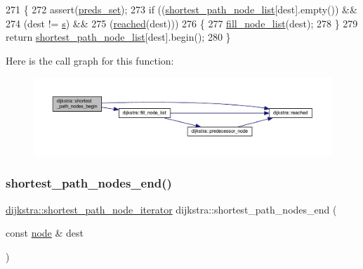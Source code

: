 \begin{DoxyCode}
271 \{
272     assert(\mbox{\hyperlink{classdijkstra_aaba530e703b5d4005b3c01fa1a11182d}{preds\_set}});
273     \textcolor{keywordflow}{if} ((\mbox{\hyperlink{classdijkstra_a67b45d0af528737830ea559ee42c4685}{shortest\_path\_node\_list}}[dest].empty()) &&
274     (dest != \mbox{\hyperlink{classdijkstra_a721bfb648626a1be2b9d276d85ebdb9d}{s}}) &&
275     (\mbox{\hyperlink{classdijkstra_a405ff80abfc9ad98668534032eed6a5b}{reached}}(dest)))
276     \{
277     \mbox{\hyperlink{classdijkstra_a71ad317c485ce76d3d22399f1a8c83fe}{fill\_node\_list}}(dest);
278     \}
279     \textcolor{keywordflow}{return} \mbox{\hyperlink{classdijkstra_a67b45d0af528737830ea559ee42c4685}{shortest\_path\_node\_list}}[dest].begin();
280 \}
\end{DoxyCode}
Here is the call graph for this function\+:\nopagebreak
\begin{figure}[H]
\begin{center}
\leavevmode
\includegraphics[width=350pt]{classdijkstra_ae30c66319d925387ed858aab9ce419ae_cgraph}
\end{center}
\end{figure}
\mbox{\label{classdijkstra_ae9846beeabd53a8cf0c0c1af328235b2}} 
\subsubsection{\texorpdfstring{shortest\+\_\+path\+\_\+nodes\+\_\+end()}{shortest\_path\_nodes\_end()}}
{\footnotesize\ttfamily \mbox{\hyperlink{classdijkstra_a2ba040b6e45343a2c3675788968d9113}{dijkstra\+::shortest\+\_\+path\+\_\+node\+\_\+iterator}} dijkstra\+::shortest\+\_\+path\+\_\+nodes\+\_\+end (\begin{DoxyParamCaption}\item[{const \mbox{\hyperlink{classnode}{node}} \&}]{dest }\end{DoxyParamCaption})}



